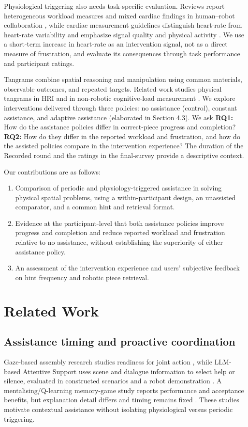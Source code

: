 \documentclass[sigconf,anonymous]{aamas}
\begin{document}
Physiological triggering also needs task-specific evaluation. Reviews report heterogeneous workload measures and mixed cardiac findings in human--robot collaboration \cite{pereira2025}, while cardiac measurement guidelines distinguish heart-rate from heart-rate variability and emphasize signal quality and physical activity \cite{quigley2024}. We use a short-term increase in heart-rate as an intervention signal, not as a direct measure of frustration, and evaluate its consequences through task performance and participant ratings.

Tangrams combine spatial reasoning and manipulation using common materials, observable outcomes, and repeated targets. Related work studies physical tangrams in HRI \cite{tabatabaei2025} and in non-robotic cognitive-load measurement \cite{melo2026}. We explore interventions delivered through three policies: no assistance (control), constant assistance, and adaptive assistance (elaborated in Section 4.3). We ask \textbf{RQ1:} How do the assistance policies differ in correct-piece progress and completion? \textbf{RQ2:} How do they differ in the reported workload and frustration, and how do the assisted policies compare in the intervention experience? The duration of the Recorded round and the ratings in the final-survey provide a descriptive context.

Our contributions are as follows:
\begin{enumerate}[font=\bfseries]
\item Comparison of periodic and physiology-triggered assistance in solving physical spatial problems, using a within-participant design, an unassisted comparator, and a common hint and retrieval format.
\item Evidence at the participant-level that both assistance policies improve progress and completion and reduce reported workload and frustration relative to no assistance, without establishing the superiority of either assistance policy.
\item An assessment of the intervention experience and users' subjective feedback on hint frequency and robotic piece retrieval.
\end{enumerate}

\section{Related Work}

\subsection{Assistance timing and proactive coordination}
Gaze-based assembly research studies readiness for joint action \cite{lavitnicora2024}, while LLM-based Attentive Support uses scene and dialogue information to select help or silence, evaluated in constructed scenarios and a robot demonstration \cite{tanneberg2024}. A mentalising/Q-learning memory-game study reports performance and acceptance benefits, but explanation detail differs and timing remains fixed \cite{andriella2025mentalising}. These studies motivate contextual assistance without isolating physiological versus periodic triggering.
\end{document}

